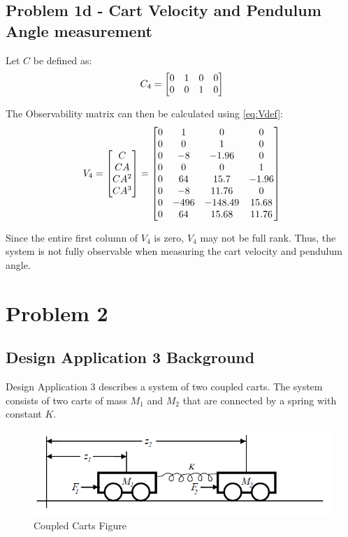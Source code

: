 \documentclass[]{article}
\begin{document}
		
	\subsection{Problem 1d - Cart Velocity and Pendulum Angle measurement}
		Let $C$ be defined as:
		\begin{equation}
			C_4 = \mqty[0	&1	&0	&0\\
						0	&0	&1	&0]
		\end{equation}
		
		The Observability matrix can then be calculated using \eqref{eq:Vdef}:
		\begin{equation}
			V_4 = \mqty[C\\ CA\\ CA^2\\ CA^3]
				= \mqty[0	&1		&0		&0\\
						0	&0		&1		&0\\
						0	&-8		&-1.96	&0\\
						0	&0		&0		&1\\
						0	&64		&15.7	&-1.96\\
						0	&-8		&11.76	&0\\
						0	&-496	&-148.49&15.68\\
						0	&64		&15.68	&11.76] \label{eq:v4def}
		\end{equation}
		
		Since the entire first column of $V_4$ is zero, $V_4$ may not be full rank. Thus, the system is not fully observable when measuring the cart velocity and pendulum angle.
		
	
\newpage
\section{Problem 2}
	\subsection{Design Application 3 Background}
		Design Application 3 describes a system of two coupled carts. The system consists of two carts of mass $M_1$ and $M_2$ that are connected by a spring with constant $K$.
		
		\begin{figure}[h]
			\centering
			\includegraphics[width=0.7\linewidth]{Fig/DesignApplication3}
			\caption{Coupled Carts Figure}
			\label{fig:designapplication3}
		\end{figure}
		
\end{document}
